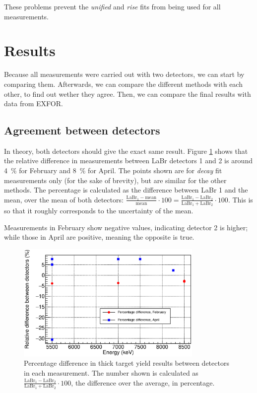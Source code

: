 \documentclass[a4paper,12pt]{report}
\begin{document}
These problems prevent the \textit{unified} and \textit{rise} fits from being used for all measurements.
\\

\section{Results}
Because all measurements were carried out with two detectors, we can start by comparing them.
Afterwards, we can compare the different methods with each other, to find out wether they agree.
Then, we can compare the final results with data from EXFOR.

\subsection{Agreement between detectors}
In theory, both detectors should give the exact same result.
Figure \ref{decay_errors_rel_per} shows that the relative difference in measurements between LaBr detectors 1 and 2 is around \qty{4}{\percent} for February and \qty{8}{\percent} for April.
The points shown are for \textit{decay} fit measurements only (for the sake of brevity), but are similar for the other methods.
The percentage is calculated as the difference between LaBr 1 and the mean, over the mean of both detectors: $\frac{\text{LaBr}_1-\text{mean}}{\text{mean}}\cdot 100 = \frac{\text{LaBr}_1-\text{LaBr}_2}{\text{LaBr}_1+\text{LaBr}_2}\cdot 100$.
This is so that it roughly corresponds to the uncertainty of the mean.

Measurements in February show negative values, indicating detector 2 is higher; while those in April are positive, meaning the opposite is true.

\begin{figure}[H]
	\centering
	\includegraphics[width=0.80\textwidth]{decay_errors_rel_per.eps}
	\caption{Percentage difference in thick target yield results between detectors in each measurement.
	The number shown is calculated as $\frac{\text{LaBr}_1-\text{LaBr}_2}{\text{LaBr}_1+\text{LaBr}_2}\cdot 100$, the difference over the average, in percentage.}
	\label{decay_errors_rel_per}
\end{figure}
\end{document}
